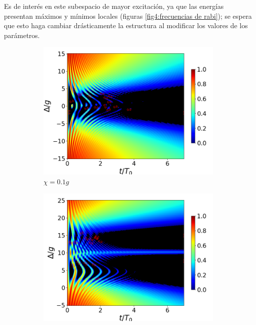 Es de interés en este subespacio de mayor excitación, ya que las energías presentan máximos y mínimos locales (figuras \ref{fig4:frecuencias de rabi}); se espera que esto haga cambiar drásticamente la estructura al modificar los valores de los parámetros.
\begin{figure}[h]
    \centering
    \begin{subfigure}{0.49\textwidth}
        \includegraphics[width=\textwidth]{figuras/ch4/concu/delta/eg1+ge1 k=0.0g x=0.1g J=0.0g gamma=0.25g concu delta dis.png}
        \caption{$\chi=0.1g$}
        \label{fig4:concu detunning 1 x1}
    \end{subfigure}
    \hfill
    \begin{subfigure}{0.49\textwidth}
        \includegraphics[width=\textwidth]{figuras/ch4/concu/delta/eg1+ge1 k=0.0g x=5.0g J=0.0g gamma=0.25g concu delta dis.png}

\end{subfigure}
\end{figure}
